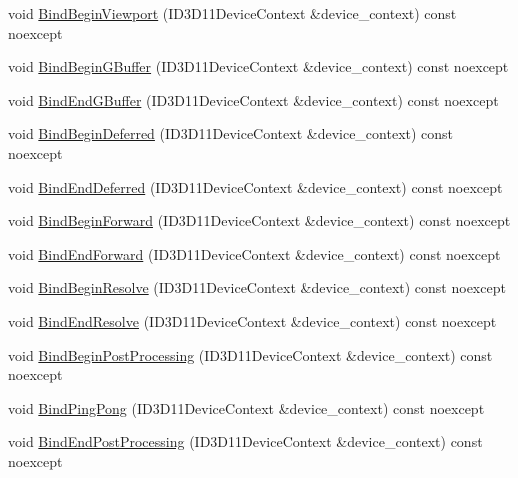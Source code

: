 \begin{DoxyCompactItemize}
\item 
void \hyperlink{classmage_1_1rendering_1_1_output_manager_a9101e210c5b04fefc52f2f14473c5742}{Bind\+Begin\+Viewport} (I\+D3\+D11\+Device\+Context \&device\+\_\+context) const noexcept
\item 
void \hyperlink{classmage_1_1rendering_1_1_output_manager_a93139563e5f5b58ccba4688c3b793e32}{Bind\+Begin\+G\+Buffer} (I\+D3\+D11\+Device\+Context \&device\+\_\+context) const noexcept
\item 
void \hyperlink{classmage_1_1rendering_1_1_output_manager_a380113a2b1c9049cfd2367a6344683b7}{Bind\+End\+G\+Buffer} (I\+D3\+D11\+Device\+Context \&device\+\_\+context) const noexcept
\item 
void \hyperlink{classmage_1_1rendering_1_1_output_manager_ad05f55888d2075806ae7a381031ecdfd}{Bind\+Begin\+Deferred} (I\+D3\+D11\+Device\+Context \&device\+\_\+context) const noexcept
\item 
void \hyperlink{classmage_1_1rendering_1_1_output_manager_af48d4e2671d7b84d3fd94961b926dd2a}{Bind\+End\+Deferred} (I\+D3\+D11\+Device\+Context \&device\+\_\+context) const noexcept
\item 
void \hyperlink{classmage_1_1rendering_1_1_output_manager_a678b86feab6fffb88752254a799d456d}{Bind\+Begin\+Forward} (I\+D3\+D11\+Device\+Context \&device\+\_\+context) const noexcept
\item 
void \hyperlink{classmage_1_1rendering_1_1_output_manager_ad0b43f26a2762ae116bc72b0cf21a6de}{Bind\+End\+Forward} (I\+D3\+D11\+Device\+Context \&device\+\_\+context) const noexcept
\item 
void \hyperlink{classmage_1_1rendering_1_1_output_manager_affa0c4b4c9c56807fe8ad4ed802fdfd9}{Bind\+Begin\+Resolve} (I\+D3\+D11\+Device\+Context \&device\+\_\+context) const noexcept
\item 
void \hyperlink{classmage_1_1rendering_1_1_output_manager_a548e6003d34916b174f74f6f1b5e85a2}{Bind\+End\+Resolve} (I\+D3\+D11\+Device\+Context \&device\+\_\+context) const noexcept
\item 
void \hyperlink{classmage_1_1rendering_1_1_output_manager_a6c22d77a812e3eacf32cfdb6d6a4d5f4}{Bind\+Begin\+Post\+Processing} (I\+D3\+D11\+Device\+Context \&device\+\_\+context) const noexcept
\item 
void \hyperlink{classmage_1_1rendering_1_1_output_manager_aacb8da12f24fe9b7f1c3aac6f52ba9a1}{Bind\+Ping\+Pong} (I\+D3\+D11\+Device\+Context \&device\+\_\+context) const noexcept
\item 
void \hyperlink{classmage_1_1rendering_1_1_output_manager_a47e4a5dfc0bca82c49ebde85e01d55cc}{Bind\+End\+Post\+Processing} (I\+D3\+D11\+Device\+Context \&device\+\_\+context) const noexcept

\end{DoxyCompactItemize}
